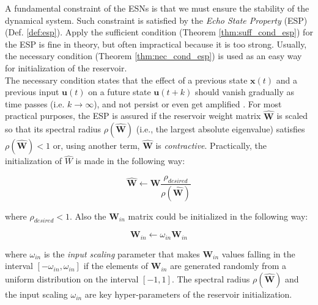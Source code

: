 A fundamental constraint of the ESNs is that we must ensure the stability of the dynamical system. Such constraint is satisfied by the \textit{Echo State Property} (ESP) \cite{jaeger2001echo} (Def. \ref{def:esp}). Apply the sufficient condition (Theorem \ref{thm:suff_cond_esp}) for the ESP is fine in theory, but often impractical because it is too strong. Usually, the necessary condition (Theorem \ref{thm:nec_cond_esp}) is used as an easy way for initialization of the reservoir. \\

The necessary condition states that the effect of a previous state $\textbf{x}(t)$ and a previous input $\textbf{u}(t)$ on a future state $\textbf{u}(t+k)$ should vanish gradually as time passes (i.e. $k\rightarrow\infty$), and not persist or even get amplified \cite{lukovsevivcius2009reservoir}. For most practical purposes, the ESP is assured if the reservoir weight matrix $\widehat{\textbf{W}}$ is scaled so that its spectral radius $\rho(\widehat{\textbf{W}})$ (i.e., the largest absolute eigenvalue) satisfies $\rho(\widehat{\textbf{W}})<1$ \cite{jaeger2001echo} or, using
another term, $\widehat{\textbf{W}}$ is \textit{contractive}. Practically, the initialization of $\widehat{W}$ is made in the following way:

\begin{equation}
    \widehat{\textbf{W}} \leftarrow \widehat{\textbf{W}} \frac{\rho_{desired}}{\rho(\widehat{\textbf{W}})}
\end{equation}

where $\rho_{desired} < 1$. Also the $\textbf{W}_{in}$ matrix could be initialized in the following way:

\begin{equation}
    \textbf{W}_{in} \leftarrow \omega_{in}\textbf{W}_{in}
\end{equation}

where $\omega_{in}$ is the \textit{input scaling} parameter that makes $\textbf{W}_{in}$ values falling in the interval $[-\omega_{in}, \omega_{in}]$ if the elements of $\textbf{W}_{in}$ are generated randomly from a uniform distribution on the interval $[-1,1]$. The spectral radius $\rho(\widehat{\textbf{W}})$ and the input scaling $\omega_{in}$ are key hyper-parameters of the reservoir initialization. \\



